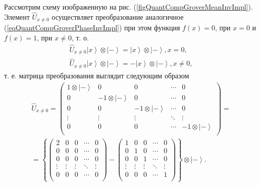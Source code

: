 

Рассмотрим схему изображенную на
рис. (\ref{figQuantCompGroverMeanInvImpl}). Элемент $\hat{U}_{x \ne 0}$
осуществляет преобразование аналогичное
(\ref{eqQuantCompGroverPhaseInvImpl}) при этом функция
$f\left(x\right) = 0$, при $x = 0$ и $f\left(x\right) = 1$, при $x \ne
0$, т. о.
\begin{eqnarray}
\hat{U}_{x \ne 0} \left|x\right>\otimes\left|-\right> 
= \left|x\right>\otimes\left|-\right>, x = 0,
\nonumber \\
\hat{U}_{x \ne 0} \left|x\right>\otimes\left|-\right> 
= - \left|x\right>\otimes\left|-\right>, x \ne 0,
\nonumber
\end{eqnarray}
т. е. матрица преобразования выглядит следующим образом
\begin{eqnarray}
\hat{U}_{x \ne 0} = 
\begin{pmatrix}
1 \otimes \left|-\right> & 0 & 0 & \cdots & 0 \\
0 & -1 \otimes \left|-\right>  & 0 & \cdots & 0 \\
0 & 0 & -1 \otimes \left|-\right>   & \cdots & 0 \\
\vdots & \vdots & \vdots & \ddots & \vdots \\
0 & 0 & 0  & \cdots & -1 \otimes \left|-\right>  \\
\end{pmatrix}
=
\nonumber \\
=
\left\{
\begin{pmatrix}
2  & 0 & 0 & \cdots & 0 \\
0 & 0 & 0 & \cdots & 0 \\
0 & 0 & 0 & \cdots & 0 \\
\vdots & \vdots & \vdots & \ddots & \vdots \\
0 & 0 & 0  & \cdots & 0 \\
\end{pmatrix} - 
\begin{pmatrix}
1 & 0 & 0 & \cdots & 0 \\
0 & 1 & 0 & \cdots & 0 \\
0 & 0 & 1 & \cdots & 0 \\
\vdots & \vdots & \vdots & \ddots & \vdots \\
0 & 0 & 0  & \cdots & 1  \\
\end{pmatrix}
\right\}
\otimes \left|-\right> 
. 
\nonumber
\end{eqnarray}

